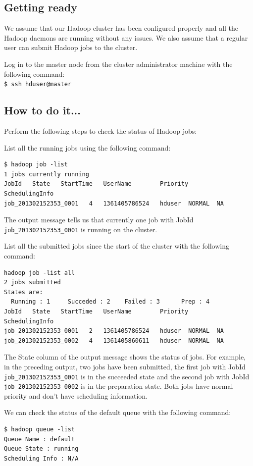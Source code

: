 \subsection*{Getting ready}
We assume that our Hadoop cluster has been configured properly and all the Hadoop daemons are running without any issues. We also assume that a regular user can submit Hadoop jobs to the cluster.

Log in to the master node from the cluster administrator machine with the following command:\\
\verb|$ ssh hduser@master|
\subsection*{How to do it...}
Perform the following steps to check the status of Hadoop jobs:

List all the running jobs using the following command: 
\begin{verbatim}
$ hadoop job -list
1 jobs currently running
JobId   State   StartTime   UserName        Priority        SchedulingInfo
job_201302152353_0001   4   1361405786524   hduser  NORMAL  NA
\end{verbatim}

The output message tells us that currently one job with JobId \verb|job_201302152353_0001| is running on the cluster.

List all the submitted jobs since the start of the cluster with the following command: 
\begin{verbatim}
hadoop job -list all
2 jobs submitted
States are:
  Running : 1     Succeded : 2    Failed : 3      Prep : 4
JobId   State   StartTime   UserName        Priority        SchedulingInfo
job_201302152353_0001   2   1361405786524   hduser  NORMAL  NA
job_201302152353_0002   4   1361405860611   hduser  NORMAL  NA
\end{verbatim}

The State column of the output message shows the status of jobs. For example, in the preceding output, two jobs have been submitted, the first job with JobId \verb|job_201302152353_0001| is in the succeeded state and the second job with JobId \verb|job_201302152353_0002| is in the preparation state. Both jobs have normal priority and don't have scheduling information.

We can check the status of the default queue with the following command:
\begin{verbatim}
$ hadoop queue -list
Queue Name : default
Queue State : running
Scheduling Info : N/A
\end{verbatim}

